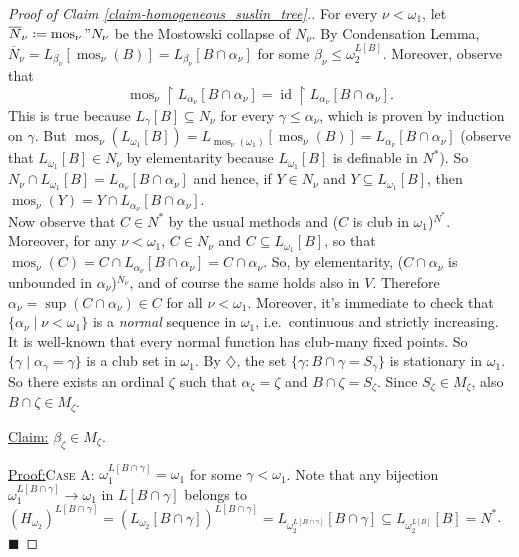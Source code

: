 \documentclass[11pt,a4paper]{report}
\theoremstyle{definition}
\theoremstyle{num.custom-title}
\theoremstyle{custom-title}
\newenvironment{claim}[1]{\par\noindent\underline{Claim#1:}\space}{} %
\newenvironment{claimproof}[1]{\par\noindent\underline{Proof:}\space#1}{\leavevmode\unskip\penalty9999 \hbox{}\nobreak\hfill\quad\hbox{$\blacksquare$}} %
\DeclareMathOperator{\id}{id}
\DeclareMathOperator{\sse}{\subseteq}
\DeclareMathOperator{\restr}{\upharpoonright}
\DeclareMathOperator{\mos}{mos}
\newcommand{\ol}{\overline}
\newcommand*{\defeq}{\mathrel{\rlap{%
                     \raisebox{0.3ex}{$\cdot$}}%
                     \raisebox{-0.3ex}{$\cdot$}}%
                     =}
\begin{document}
\begin{proof}[Proof of Claim \ref{claim-homogeneous_suslin_tree}.]
For every $\nu < \omega_1$, let $\ol{N}_\nu \defeq \mos_\nu" N_\nu$ be the Mostowski collapse of $N_\nu$. By Condensation Lemma, $\ol{N}_\nu = L_{\beta_\nu}[\mos_\nu(B)] = L_{\beta_\nu}[B \cap \alpha_\nu]$ for some $\beta_\nu \leq \omega_2^{L[B]}$. Moreover, observe that
\[
\mos_\nu \restr L_{\alpha_\nu} [B \cap \alpha_\nu] = \id \restr L_{\alpha_\nu} [B \cap \alpha_\nu].
\]
This is true because $L_\gamma[B] \sse N_\nu$ for every $\gamma \leq \alpha_\nu$, which is proven by induction on $\gamma$.
But $\mos_\nu(L_{\omega_1}[B]) = L_{\mos_\nu(\omega_1)}[\mos_\nu(B)] = L_{\alpha_\nu}[B \cap \alpha_\nu]$ (observe that $L_{\omega_1}[B] \in N_\nu$ by elementarity because $L_{\omega_1}[B]$ is definable in $N^*$). So $N_\nu \cap L_{\omega_1}[B] = L_{\alpha_\nu}[B \cap \alpha_\nu]$ and hence, if $Y \in N_\nu$ and $Y \sse L_{\omega_1}[B]$, then $\mos_\nu(Y) = Y \cap L_{\alpha_\nu}[B \cap \alpha_\nu]$.
\\[10pt]
Now observe that $C \in N^*$ by the usual methods and ($C$ is club in $\omega_1$)$^{N^*}$. Moreover, for any $\nu < \omega_1$, $C \in N_\nu$ and $C \sse L_{\omega_1}[B]$, so that $\mos_\nu (C) = C \cap L_{\alpha_\nu}[B \cap \alpha_\nu] = C \cap \alpha_\nu$. So, by elementarity, ($C \cap \alpha_\nu$ is unbounded in $\alpha_\nu$)$^{\ol{N}_\nu}$, and of course the same holds also in $V$. Therefore $\alpha_\nu = \sup(C \cap \alpha_\nu) \in C$ for all $\nu < \omega_1$.
Moreover, it's immediate to check that $\{\alpha_\nu \mid \nu < \omega_1\}$ is a \emph{normal} sequence in $\omega_1$, i.e.\ continuous and strictly increasing. It is well-known that every normal function has club-many fixed points. So $\{\gamma \mid \alpha_\gamma = \gamma\}$ is a club set in $\omega_1$. By $\diamondsuit$, the set $\{\gamma : B \cap \gamma = S_\gamma\}$ is stationary in $\omega_1$. So there exists an ordinal $\zeta$ such that $\alpha_\zeta = \zeta$ and $B \cap \zeta = S_\zeta$. Since $S_\zeta \in M_\zeta$, also $B \cap \zeta \in M_\zeta$.
\\[-10pt]
\begin{claim}{}
$\beta_\zeta \in M_\zeta$.
\begin{claimproof}
\textsc{Case A:} $\omega_1^{L[B \cap \gamma]} = \omega_1$ for some $\gamma < \omega_1$. Note that any bijection $\omega_1^{L[B \cap \gamma]} \to \omega_1$ in $L[B \cap \gamma]$ belongs to $(H_{\omega_2})^{L[B \cap \gamma]} = (L_{\omega_2}[B \cap \gamma])^{L[B \cap \gamma]} = L_{\omega_2^{L[B \cap \gamma]}}[B \cap \gamma] \sse L_{\omega_2^{L[B]}}[B] = N^*$.\\

\end{claimproof}
\end{claim}
\end{proof}
\end{document}
